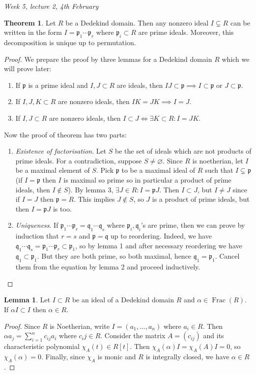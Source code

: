 \documentclass{article}
\newcommand{\Frac}{\operatorname{Frac}}
\newcommand{\ip}{\mathfrak{p}}
\newcommand{\iq}{\mathfrak{q}}
\theoremstyle{definition}
\newtheorem{thm}[defn]{Theorem}
\newtheorem{lemma}[defn]{Lemma}
\begin{document}
\begin{flushright}
\textit{Week 5, lecture 2, 4th February}
\end{flushright}

\begin{thm}
\label{thm:uniquefactinDD}
Let $R$ be a Dedekind domain. Then any nonzero ideal $I\subsetneq R$ can be written in the form $I=\ip_1\cdots\ip_r$ where $\ip_i\subset R$ are prime ideals. Moreover, this decomposition is unique up to permutation.
\end{thm}
\begin{proof}
We prepare the proof by three lemmas for a Dedekind domain $R$ which we will prove later:
\begin{enumerate}
\item If $\ip$ is a prime ideal and $I,J\subset R$ are ideals, then $IJ\subset\ip\implies I\subset\ip$ or $J\subset\ip$.
\item If $I,J,K\subset R$ are nonzero ideals, then $IK=JK\implies I=J$.
\item If $I,J\subset R$ are nonzero ideals, then $I\subset J\iff\exists K\subset R:I=JK$.
\end{enumerate}
Now the proof of theorem has two parts:
\begin{enumerate}
\item \textit{Existence of factorisation}. Let $S$ be the set of ideals which are not products of prime ideals. For a contradiction, suppose $S\neq\varnothing$. Since $R$ is noetherian, let $I$ be a maximal element of $S$. Pick $\ip$ to be a maximal ideal of $R$ such that $I\subsetneq\ip$ (if $I=\ip$ then $I$ is maximal so prime so in particular a product of prime ideals, then $I\notin S$). By lemma 3, $\exists J\in R:I=\ip J$. Then $I\subset J$, but $I\neq J$ since if $I=J$ then $\ip=R$. This implies $J\notin S$, so $J$ is a product of prime ideals, but then $I=\ip J$ is too.
\item \textit{Uniqueness}. If $\ip_1\cdots\ip_r=\iq_1\cdots\iq_s$ where $\ip_i,\iq_i$'s are prime, then we can prove by induction that $r=s$ and $\ip=\iq$ up to reordering. Indeed, we have $\iq_1\cdots\iq_s=\ip_1\cdots\ip_r\subset\ip_1$, so by lemma 1 and after necessary reordering we have $\iq_1\subset\ip_1$. But they are both prime, so both maximal, hence $\iq_1=\ip_1$. Cancel them from the equation by lemma 2 and proceed inductively.
\end{enumerate}
\end{proof}

\begin{lemma}
\label{lemma:aIinIimpliesainR}
Let $I\subset R$ be an ideal of a Dedekind domain $R$ and $\alpha\in\Frac(R)$. If $\alpha I\subset I$ then $\alpha\in R$.
\end{lemma}
\begin{proof}
Since $R$ is Noetherian, write $I=(a_1,\ldots,a_n)$ where $a_i\in R$. Then $\alpha a_j=\sum_{i=1}^n c_{ij} a_i$ where $c_ij\in R$. Consider the matrix $A=(c_{ij})$ and its characteristic polynomial $\chi_A(t)\in R[t]$. Then $\chi_A(\alpha)I=\chi_A(A)I=0$, so $\chi_A(\alpha)=0$. Finally, since $\chi_A$ is monic and $R$ is integrally closed, we have $\alpha\in R$.
\end{proof}
\end{document}
